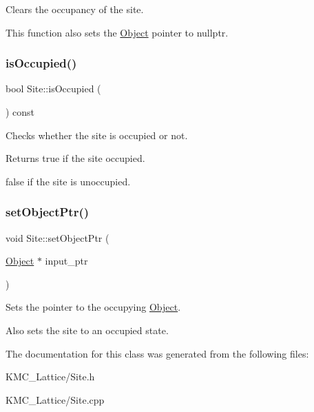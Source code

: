Clears the occupancy of the site. 

This function also sets the \hyperlink{class_object}{Object} pointer to nullptr. \mbox{\label{class_site_a30991b768ded0bb441c5bb54a789160a}} 
\subsubsection{\texorpdfstring{is\+Occupied()}{isOccupied()}}
{\footnotesize\ttfamily bool Site\+::is\+Occupied (\begin{DoxyParamCaption}{ }\end{DoxyParamCaption}) const}



Checks whether the site is occupied or not. 

\begin{DoxyReturn}{Returns}
true if the site occupied. 

false if the site is unoccupied. 
\end{DoxyReturn}
\mbox{\label{class_site_a9a0d305451d7732dbb193e7fd2f502ca}} 
\subsubsection{\texorpdfstring{set\+Object\+Ptr()}{setObjectPtr()}}
{\footnotesize\ttfamily void Site\+::set\+Object\+Ptr (\begin{DoxyParamCaption}\item[{\hyperlink{class_object}{Object} $\ast$}]{input\+\_\+ptr }\end{DoxyParamCaption})}



Sets the pointer to the occupying \hyperlink{class_object}{Object}. 

Also sets the site to an occupied state. 

The documentation for this class was generated from the following files\+:\begin{DoxyCompactItemize}
\item 
K\+M\+C\+\_\+\+Lattice/Site.\+h\item 
K\+M\+C\+\_\+\+Lattice/Site.\+cpp\end{DoxyCompactItemize}
